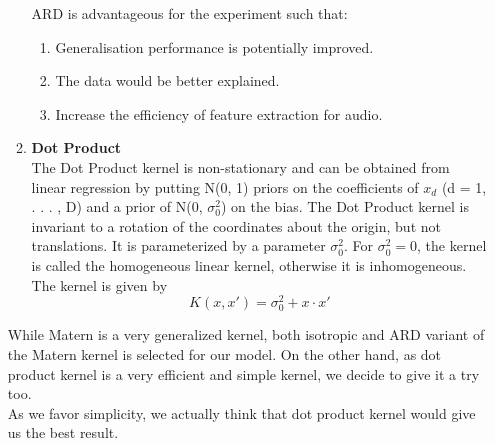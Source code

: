 \documentclass{article}
\begin{document}
\begin{enumerate}
\begin{enumerate}
			ARD is advantageous for the experiment such that: \cite{Cawley2014}
			\begin{enumerate}
				\item Generalisation performance is potentially improved.
				\item The data would be better explained.
				\item Increase the efficiency of feature extraction for audio.
			\end{enumerate}
			
			\item \textbf{Dot Product}\\
			The Dot Product kernel is non-stationary and can be obtained from linear regression by putting N(0, 1) priors on the coefficients 
			of \(x_{d}\) (d = 1, . . . , D) and a prior of N(0, \(\sigma_{0}^{2}\)) on the bias. 
			The Dot Product kernel is invariant to a rotation of the coordinates about the origin, but not translations. 
			It is parameterized by a parameter \(\sigma_{0}^{2}\). For \(\sigma_{0}^{2} = 0\), 
			the kernel is called the homogeneous linear kernel, otherwise it is inhomogeneous. The kernel is given by
			\begin{equation}\label{eq:kernel_dp}
				K(x,x') = \sigma_{0}^{2} + x \cdot x'  
			\end{equation}
		\end{enumerate}

		While Matern is a very generalized kernel, both isotropic and ARD variant of the Matern kernel is selected for our model. 
		On the other hand, as dot product kernel is a very efficient and simple kernel, 
		we decide to give it a try too. \\
		As we favor simplicity, we actually think that dot product kernel would give us the best result.
	\end{enumerate}
\end{document}
